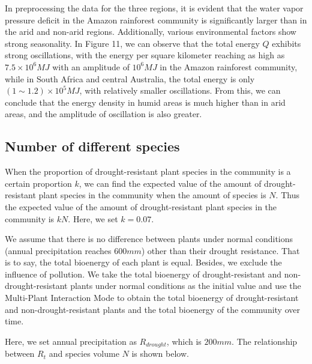 \documentclass[12pt]{article}  %
\begin{document}
In preprocessing the data for the three regions, it is evident that the water vapor pressure deficit in the Amazon rainforest community is significantly larger than in the arid and non-arid regions. Additionally, various environmental factors show strong seasonality. In Figure 11, we can observe that the total energy $Q$ exhibits strong oscillations, with the energy per square kilometer reaching as high as $7.5\times 10^6MJ$ with an amplitude of $10^6MJ$ in the Amazon rainforest community, while in South Africa and central Australia, the total energy is only $(1\sim 1.2)\times 10^5MJ$, with relatively smaller oscillations. From this, we can conclude that the energy density in humid areas is much higher than in arid areas, and the amplitude of oscillation is also greater.

\subsection{Number of different species}

When the proportion of drought-resistant plant species in the community is a certain proportion $k$, we can find the expected value of the amount of drought-resistant plant species in the community when the amount of species is $N$. Thus the expected value of the amount of drought-resistant plant species in the community is $kN$. Here, we set $k=0.07$.

We assume that there is no difference between plants under normal conditions (annual precipitation reaches $600mm$) other than their drought resistance. That is to say, the total bioenergy of each plant is equal. Besides, we exclude the influence of pollution. We take the total bioenergy of drought-resistant and non-drought-resistant plants under normal conditions as the initial value and use the Multi-Plant Interaction Mode to obtain the total bioenergy of drought-resistant and non-drought-resistant plants and the total bioenergy of the community over time. 

Here, we set annual precipitation as $R_{drought}$, which is $200mm$. The relationship between $R_t$ and species volume $N$ is shown below.
\end{document}
